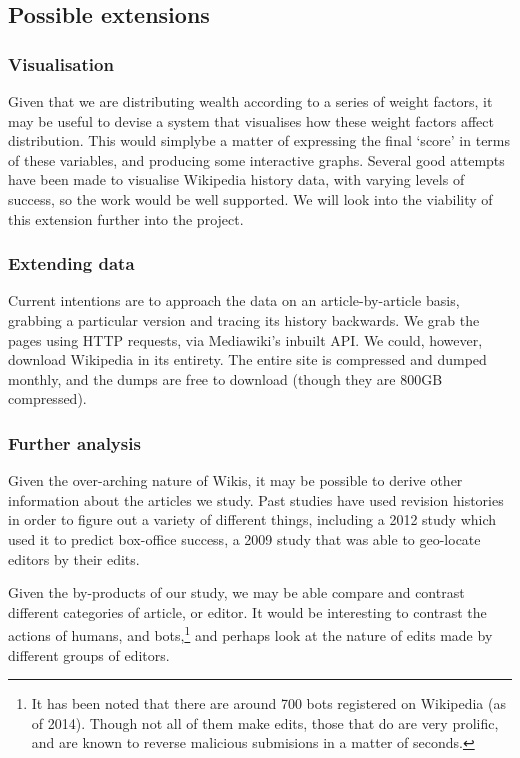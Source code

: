 \documentclass[a4paper,11pt,twoside,notitlepage]{article}
\begin{document}
        \subsection*{Possible extensions}
        \subsubsection*{Visualisation}
        Given that we are distributing wealth according to a series of
        weight factors, it may be useful to devise a system that
        visualises how these weight factors affect distribution. This
        would simplybe a matter of expressing the final
        `score' in terms of these variables, and producing some
        interactive graphs. Several good attempts have been made to
        visualise Wikipedia history data, with varying levels of
        success,\cite{Chi2008}\cite{Sabel2007}\cite{Suh2007}\cite{Wu2013}\cite{Viegas2004} so the
        work would be well supported. We will look into the viability
        of this extension further into the project.
        
        \subsubsection*{Extending data}
        Current intentions are to approach the data on an
        article-by-article basis, grabbing a particular version and
        tracing its history backwards. We grab the pages using HTTP
        requests, via Mediawiki's inbuilt API. We could, however,
        download Wikipedia in its entirety. The entire site is
        compressed and dumped monthly, and the dumps are free to
        download (though they are 800GB compressed).\cite{wiki-dump}

        \subsubsection*{Further analysis}
        Given the over-arching nature of Wikis, it may be possible to
        derive other information about the articles we
        study. Past studies have used revision histories in order to
        figure out a variety of different things, including a
        2012 study which used it to predict box-office
        success,\cite{Mestyan2012} a 2009 study that was able to
        geo-locate editors by their edits.\cite{Lieberman2009}

        Given the by-products of our study, we may be able compare and
        contrast different categories of article, or editor. It would
        be interesting to contrast the actions of humans, and
        bots,\footnote{It has been noted that there are around 700
          bots registered on Wikipedia (as of 2014). Though not all of
          them make edits, those that do are very prolific, and are
          known to reverse malicious submisions in a matter of
          seconds.\cite{wiki-bots}\cite{bbc-bots}} and perhaps look at
        the nature of edits made by different groups of editors.
\end{document}
